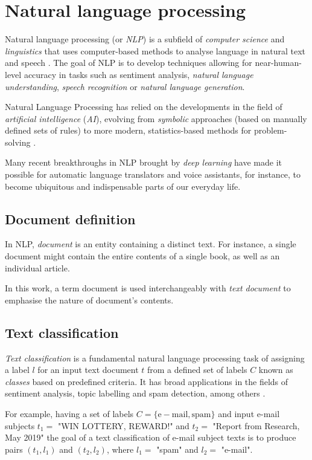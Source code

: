 \section{Natural language processing}

Natural language processing (or \emph{NLP}) is a subfield of \emph{computer science} and \emph{linguistics} that uses computer-based methods to analyse language in natural text and speech \cite{nlp_def}. The goal of NLP is to develop techniques allowing for near-human-level accuracy in tasks such as sentiment analysis, \emph{natural language understanding}, \emph{speech recognition} or \emph{natural language generation}.

Natural Language Processing has relied on the developments in the field of \emph{artificial intelligence} (\emph{AI}), evolving from \emph{symbolic} approaches (based on manually defined sets of rules) to more modern, statistics-based methods for problem-solving \cite{handbook_nlp}.

Many recent breakthroughs in NLP brought by \emph{deep learning} have made it possible for automatic language translators and voice assistants, for instance, to become ubiquitous and indispensable parts of our everyday life.

\subsection{Document definition}

In NLP, \emph{document} is an entity containing a distinct text. For instance, a single document might contain the entire contents of a single book, as well as an individual article.

In this work, a term document is used interchangeably with \emph{text document} to emphasise the nature of document's contents.

\subsection{Text classification}

\emph{Text classification} is a fundamental natural language processing task of assigning a label $l$ for an input text document $t$ from a defined set of labels $C$ known as \emph{classes} based on predefined criteria. It has broad applications in the fields of sentiment analysis, topic labelling and spam detection, among others \cite{wiki:doc_classification}.

For example, having a set of labels $C = \{\mathrm{e-mail}, \mathrm{spam}\}$ and input e-mail subjects $t_1 =$ "WIN LOTTERY, REWARD!" and $t_2 = $ "Report from Research, May 2019" the goal of a text classification of e-mail subject texts is to produce pairs $(t_1, l_1)$ and $(t_2, l_2)$, where $l_1 = $ "spam" and $l_2 = $ "e-mail".


